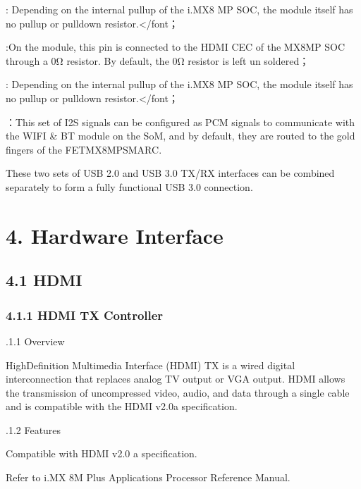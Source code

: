 \documentclass[letterpaper,10pt,openany,english]{sphinxmanual}
\begin{document}
 : Depending on the internal pull\sphinxhyphen{}up of the i.MX8 MP SOC, the module itself has no pull\sphinxhyphen{}up or pull\sphinxhyphen{}down resistor.</font；

 :On the module, this pin is connected to the HDMI \sphinxhyphen{} CEC of the MX8MP SOC through a 0Ω resistor. By default, the 0Ω resistor is left un \sphinxhyphen{} soldered；

 : Depending on the internal pull\sphinxhyphen{}up of the i.MX8 MP SOC, the module itself has no pull\sphinxhyphen{}up or pull\sphinxhyphen{}down resistor.</font；

 ：This set of I2S signals can be configured as PCM signals to communicate with the WIFI \& BT module on the SoM, and by default, they are routed to the gold fingers of the FET\sphinxhyphen{}MX8MP\sphinxhyphen{}SMARC.

\sphinxAtStartPar
These two sets of USB 2.0 and USB 3.0 TX/RX interfaces can be combined separately to form a fully functional USB 3.0 connection.


\chapter{4. Hardware Interface}
\label{\detokenize{hardware:hardware-interface}}

\section{4.1 HDMI}
\label{\detokenize{hardware:hdmi}}

\subsection{4.1.1 HDMI TX Controller}
\label{\detokenize{hardware:hdmi-tx-controller}}
.1.1 Overview

\sphinxAtStartPar
High\sphinxhyphen{}Definition Multimedia Interface (HDMI) TX is a wired digital interconnection that replaces analog TV output or VGA output. HDMI allows the transmission of uncompressed video, audio, and data through a single cable and is compatible with the HDMI v2.0a specification.

.1.2 Features

\sphinxAtStartPar
Compatible with HDMI v2.0 a specification.

\sphinxAtStartPar
Refer to i.MX 8M Plus Applications Processor Reference Manual.
\end{document}
